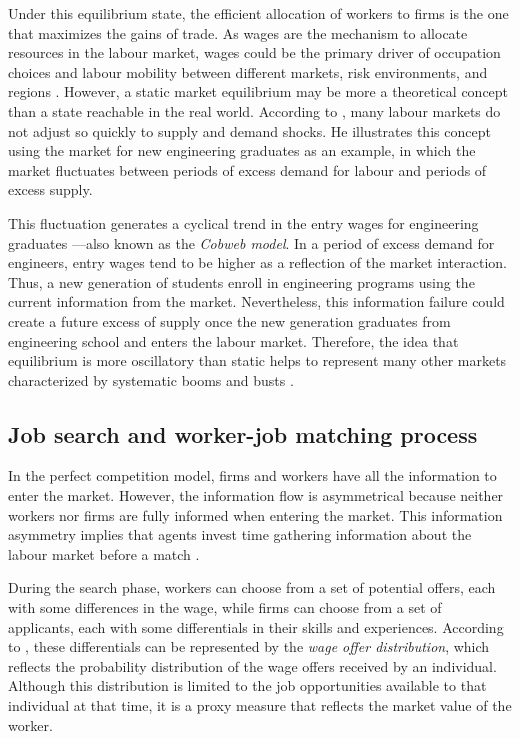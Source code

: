 Under this equilibrium state, the efficient allocation of workers to firms is the one that maximizes the gains of trade. As wages are the mechanism to allocate resources in the labour market, wages could be the primary driver of occupation choices and labour mobility between different markets, risk environments, and regions \citep{Borjas2020}. However, a static market equilibrium may be more a theoretical concept than a state reachable in the real world. According to \citet{Borjas2020}, many labour markets do not adjust so quickly to supply and demand shocks. He illustrates this concept using the market for new engineering graduates as an example, in which the market fluctuates between periods of excess demand for labour and periods of excess supply. 

This fluctuation generates a cyclical trend in the entry wages for engineering graduates —also known as the \textit{Cobweb model}. In a period of excess demand for engineers, entry wages tend to be higher as a reflection of the market interaction. Thus, a new generation of students enroll in engineering programs using the current information from the market. Nevertheless, this information failure could create a future excess of supply once the new generation graduates from engineering school and enters the labour market. Therefore, the idea that equilibrium is more oscillatory than static helps to represent many other markets characterized by systematic booms and busts \citep{Benjamin2021,Borjas2020}. 

\subsection{Job search and worker-job matching process} 

In the perfect competition model, firms and workers have all the information to enter the market. However, the information flow is asymmetrical because neither workers nor firms are fully informed when entering the market. This information asymmetry implies that agents invest time gathering information about the labour market before a match \citep{Borjas2020}. 

During the search phase, workers can choose from a set of potential offers, each with some differences in the wage, while firms can choose from a set of applicants, each with some differentials in their skills and experiences. According to \citet{Benjamin2021}, these differentials can be represented by the \textit{wage offer distribution}, which reflects the probability distribution of the wage offers received by an individual. Although this distribution is limited to the job opportunities available to that individual at that time, it is a proxy measure that reflects the market value of the worker. 

